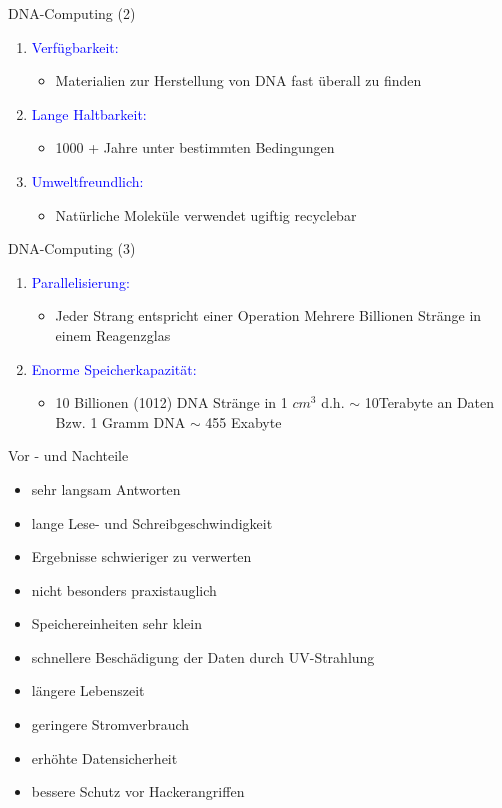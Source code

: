 \documentclass{beamer}
\begin{document}
\begin{frame}{DNA-Computing (2)}
	\begin{enumerate}
	\item \textcolor{blue}{Verfügbarkeit:}
		\begin{itemize}	
		\item Materialien zur Herstellung von DNA fast überall zu finden
	\end{itemize} 
\pause \item \textcolor{blue}{Lange Haltbarkeit:}
\begin{itemize}	
	\item 1000 + Jahre unter bestimmten Bedingungen
\end{itemize} 
\pause \item \textcolor{blue}{Umweltfreundlich:}
\begin{itemize}	
	\item  Natürliche Moleküle verwendet ugiftig recyclebar  	
\end{itemize} 
	\end{enumerate}
\end{frame}

\begin{frame}{DNA-Computing (3)}
	\begin{enumerate}
		\item \textcolor{blue}{Parallelisierung:}
		\begin{itemize}	
			\item Jeder Strang entspricht einer Operation
			Mehrere Billionen Stränge in einem Reagenzglas 
		\end{itemize} 
		\item \textcolor{blue}{Enorme Speicherkapazität:}
		\begin{itemize}	
			\item 10 Billionen (1012) DNA Stränge in 1 	${cm}^3$ d.h. $\sim$ 10Terabyte an Daten
			Bzw. 1 Gramm DNA $\sim$ 455 Exabyte
		\end{itemize} 
	\end{enumerate}
\end{frame}

\begin{frame}{Vor - und Nachteile}
	\begin{itemize}
	\item sehr langsam Antworten 
	\pause \item lange Lese- und Schreibgeschwindigkeit 
	\pause \item Ergebnisse schwieriger zu verwerten
	\pause \item nicht besonders praxistauglich	
	\pause \item Speichereinheiten sehr klein 	
	\pause \item schnellere Beschädigung der Daten durch UV-Strahlung  	
	\pause \item längere Lebenszeit	
	\pause \item geringere Stromverbrauch	
	\pause \item erhöhte Datensicherheit 	
	\pause \item bessere Schutz vor Hackerangriffen
	\end{itemize}
\end{frame}
\end{document}
